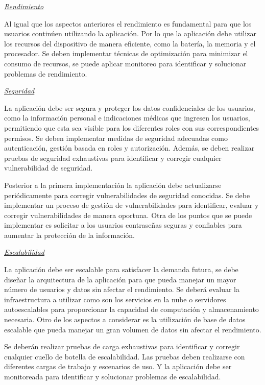 \documentclass[a4paper,12pt]{article}
\begin{document}
    \newline
    \par \textit{\underline{Rendimiento}} 
    \newline
    \par Al igual que los aspectos anteriores el rendimiento es fundamental para que los usuarios continúen utilizando la aplicación. Por lo que la aplicación debe utilizar los recursos del dispositivo de manera eficiente, como la batería, la memoria y el procesador. Se deben implementar técnicas de optimización para minimizar el consumo de recursos, se puede aplicar monitoreo para identificar y solucionar problemas de rendimiento.
    \newline
    \par \textit{\underline{Seguridad}} 
    \newline
    \par La aplicación debe ser segura y proteger los datos confidenciales de los usuarios, como la información personal e indicaciones médicas que ingresen los usuarios, permitiendo que esta sea visible para los diferentes roles con sus correspondientes permisos. Se deben implementar medidas de seguridad adecuadas como autenticación, gestión basada en roles y autorización. Además, se deben realizar pruebas de seguridad exhaustivas para identificar y corregir cualquier vulnerabilidad de seguridad.
    \par Posterior a la primera implementación la aplicación debe actualizarse periódicamente para corregir vulnerabilidades de seguridad conocidas. Se debe implementar un proceso de gestión de vulnerabilidades para identificar, evaluar y corregir vulnerabilidades de manera oportuna. Otra de los puntos que se puede implementar es solicitar a los usuarios contraseñas seguras y confiables para aumentar la protección de la información.
    \newline
    \par \textit{\underline{Escalabilidad}} 
    \newline
    \par La aplicación debe ser escalable para satisfacer la demanda futura, se debe diseñar la arquitectura de la aplicación para que pueda manejar un mayor número de usuarios y datos sin afectar el rendimiento. Se deberá evaluar la infraestructura a utilizar como son los servicios en la nube o servidores autoescalables para proporcionar la capacidad de computación y almacenamiento necesaria. Otro de los aspectos a considerar es la utilización de base de datos escalable que pueda manejar un gran volumen de datos sin afectar el rendimiento.
    \par Se deberán realizar pruebas de carga exhaustivas para identificar y corregir cualquier cuello de botella de escalabilidad. Las pruebas deben realizarse con diferentes cargas de trabajo y escenarios de uso. Y la aplicación debe ser monitoreada para identificar y solucionar problemas de escalabilidad.
\end{document}

